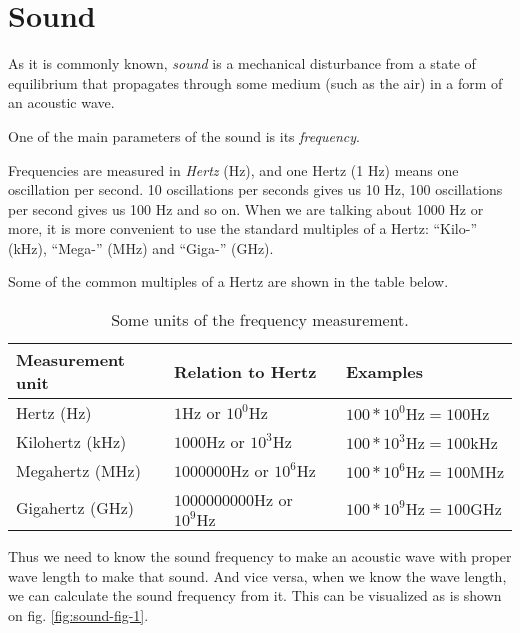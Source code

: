 \documentclass[../sparc.tex]{subfiles}
\begin{document}
\section{Sound}

As it is commonly known, \emph{sound} is a mechanical disturbance from a state
of equilibrium that propagates through some medium (such as the air) in a form
of an acoustic wave. \cite{britannica:sound}

One of the main parameters of the sound is its \emph{frequency}.

Frequencies are measured in \emph{Hertz} (\gls{Hz}), and one Hertz (1 Hz) means
one oscillation per second.  10 oscillations per seconds gives us 10 Hz, 100
oscillations per second gives us 100 Hz and so on.  When we are talking about
1000 Hz or more, it is more convenient to use the standard multiples of a Hertz:
``Kilo-'' (\gls{kHz}), ``Mega-'' (\gls{MHz}) and ``Giga-'' (\gls{GHz}).

Some of the common multiples of a Hertz are shown in the table below.

\begin{table}[h]
  \centering
  \begin{tabular}{p{3cm}|p{4cm}|p{3.5cm}}
    Measurement unit & Relation to Hertz & Examples \\
    \hline \hline
    Hertz (Hz)
    & $ 1 \mbox{Hz} $ or $ 10^0 \mbox{Hz} $
    & $ 100 * 10^0 \mbox{Hz} = 100 \mbox{Hz} $ \\
    \hline
    Kilohertz (kHz)
    & $ 1000 \mbox{Hz} $ or $ 10^3 \mbox{Hz} $
    & $ 100 * 10^3 \mbox{Hz} = 100 \mbox{kHz} $ \\
    \hline
    Megahertz (MHz)
    & $ 1000000 \mbox{Hz} $ or $ 10^6 \mbox{Hz} $
    & $ 100 * 10^6 \mbox{Hz} = 100 \mbox{MHz} $ \\
    \hline
    Gigahertz (GHz)
    & $ 1000000000 \mbox{Hz} $ or $ 10^9 \mbox{Hz} $
    & $ 100 * 10^9 \mbox{Hz} = 100 \mbox{GHz} $ \\
  \end{tabular}
  \caption{Some units of the frequency measurement.}
  \label{table:sound-hertz-scale}
\end{table}

Thus we need to know the sound frequency to make an acoustic wave with proper
wave length to make that sound.  And vice versa, when we know the wave length,
we can calculate the sound frequency from it.  This can be visualized as is
shown on fig. \ref{fig:sound-fig-1}.
\end{document}
